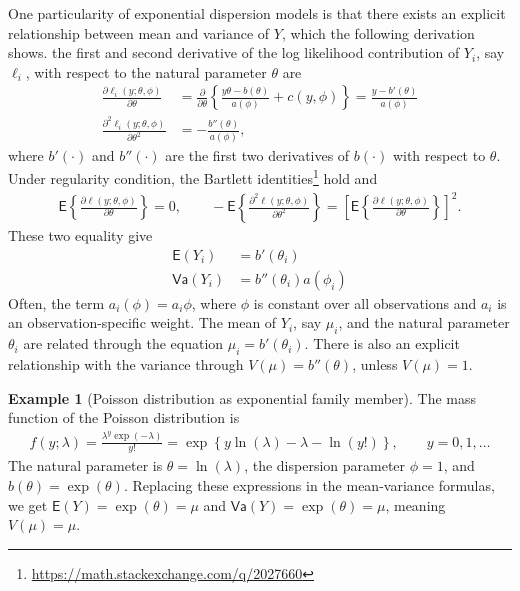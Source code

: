 \documentclass[
  11pt,
  letterpaper,
]{book}
\renewcommand{\href}[2]{#2\footnote{\url{#1}}}
\theoremstyle{definition}
\theoremstyle{definition}
\newtheorem{example}{Example}[chapter]
\theoremstyle{definition}
\theoremstyle{remark}
\begin{document}
One particularity of exponential dispersion models is that there exists an explicit relationship between mean and variance of \(Y\), which the following derivation shows. the first and second derivative of the log likelihood contribution of \(Y_i\), say \(\ell_i\), with respect to the natural parameter \(\theta\) are
\begin{align*}
\frac{\partial \ell_i(y; \theta, \phi)}{\partial \theta} &= \frac{\partial}{\partial \theta} \left\{\frac{y\theta-b(\theta)}{a(\phi)} + c(y, \phi) \right\} = \frac{y - b'(\theta)}{a(\phi)}\\
\frac{\partial^2 \ell_i(y; \theta, \phi)}{\partial \theta^2} &= - \frac{b''(\theta)}{a(\phi)},
\end{align*}
where \(b'(\cdot)\) and \(b''(\cdot)\) are the first two derivatives of \(b(\cdot)\) with respect to \(\theta\).
Under regularity condition, the \href{https://math.stackexchange.com/q/2027660}{Bartlett identities} hold and
\begin{align*}
\mathsf{E}\left\{\frac{\partial \ell(y; \theta, \phi)}{\partial \theta}\right\}=0, \qquad - \mathsf{E}\left\{\frac{\partial^2 \ell(y; \theta, \phi)}{\partial \theta^2}\right\} = \left[\mathsf{E}\left\{\frac{\partial \ell(y; \theta, \phi)}{\partial \theta}\right\}\right]^2.
\end{align*}
These two equality give
\begin{align*}
\mathsf{E}(Y_i) &= b'(\theta_i) \\
\mathsf{Va}(Y_i) &= b''(\theta_i)a(\phi_i)
\end{align*}
Often, the term \(a_i(\phi)=a_i\phi\), where \(\phi\) is constant over all observations and \(a_i\) is an observation-specific weight.
The mean of \(Y_i\), say \(\mu_i\), and the natural parameter \(\theta_i\) are related through the equation \(\mu_i=b'(\theta_i)\). There is also an explicit relationship with the variance through \(V(\mu)=b''(\theta)\), unless \(V(\mu)=1\).

\begin{example}[Poisson distribution as exponential family member]
\protect\hypertarget{exm:poissonglmexpf}{}{\label{exm:poissonglmexpf} {} }The mass function of the Poisson distribution is
\begin{align*}
f(y; \lambda) = \frac{\lambda^y \exp(-\lambda)}{y!} =\exp \left\{ y \ln
(\lambda) -\lambda-\ln(y!)\right\}, \qquad y=0,1, \ldots
\end{align*}
The natural parameter is \(\theta =\ln(\lambda)\), the dispersion
parameter \(\phi=1\), and \(b(\theta)=\exp(\theta)\). Replacing these expressions in the mean-variance formulas, we get \(\mathsf{E}(Y)=\exp(\theta)=\mu\) and \(\mathsf{Va}(Y)=\exp(\theta)=\mu\), meaning \(V(\mu)=\mu\).
\end{example}
\end{document}
